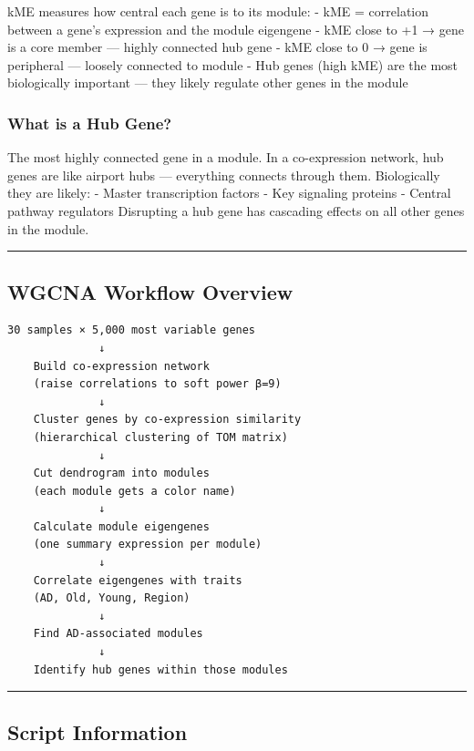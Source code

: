 \documentclass[
]{article}
\begin{document}
kME measures how central each gene is to its module: - kME = correlation
between a gene's expression and the module eigengene - kME close to +1 →
gene is a core member --- highly connected hub gene - kME close to 0 →
gene is peripheral --- loosely connected to module - Hub genes (high
kME) are the most biologically important --- they likely regulate other
genes in the module

\subsubsection{What is a Hub Gene?}\label{what-is-a-hub-gene}

The most highly connected gene in a module. In a co-expression network,
hub genes are like airport hubs --- everything connects through them.
Biologically they are likely: - Master transcription factors - Key
signaling proteins - Central pathway regulators Disrupting a hub gene
has cascading effects on all other genes in the module.

\begin{center}\rule{0.5\linewidth}{0.5pt}\end{center}

\subsection{WGCNA Workflow Overview}\label{wgcna-workflow-overview}

\begin{verbatim}
30 samples × 5,000 most variable genes
              ↓
    Build co-expression network
    (raise correlations to soft power β=9)
              ↓
    Cluster genes by co-expression similarity
    (hierarchical clustering of TOM matrix)
              ↓
    Cut dendrogram into modules
    (each module gets a color name)
              ↓
    Calculate module eigengenes
    (one summary expression per module)
              ↓
    Correlate eigengenes with traits
    (AD, Old, Young, Region)
              ↓
    Find AD-associated modules
              ↓
    Identify hub genes within those modules
\end{verbatim}

\begin{center}\rule{0.5\linewidth}{0.5pt}\end{center}

\subsection{Script Information}\label{script-information-1}
\end{document}
